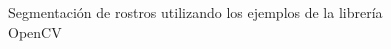 \documentclass[letterpaper,12pt]{article}
\begin{document}
\begin{figure}[H]
\caption{Segmentación de rostros utilizando los ejemplos de la librería OpenCV}
\label{Fig:EOp}
\end{figure}








\end{document}

